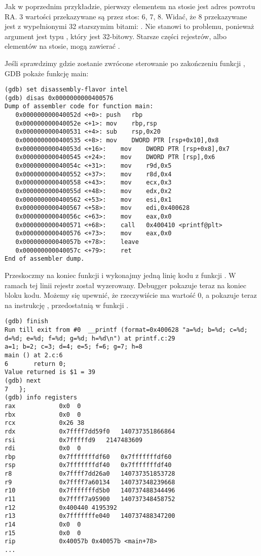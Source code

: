 Jak w poprzednim przykładzie, pierwszy elementem na stosie jest adres powrotu \ac{RA}.
3 wartości przekazywane są przez stos: 6, 7, 8.
Widać, że 8 przekazywane jest z wypełnionymi 32 starszymim bitami: .
Nie stanowi to problemu, ponieważ argument jest typu \Tint, który jest 32-bitowy.
Starsze części rejestrów, albo elementów na stosie, mogą zawierać .

Jeśli sprawdzimy gdzie zostanie zwrócone sterowanie po zakończeniu funkcji \printf, \ac{GDB} pokaże funkcję main:

\begin{lstlisting}[style=customasmx86]
(gdb) set disassembly-flavor intel
(gdb) disas 0x0000000000400576
Dump of assembler code for function main:
   0x000000000040052d <+0>:	push   rbp
   0x000000000040052e <+1>:	mov    rbp,rsp
   0x0000000000400531 <+4>:	sub    rsp,0x20
   0x0000000000400535 <+8>:	mov    DWORD PTR [rsp+0x10],0x8
   0x000000000040053d <+16>:	mov    DWORD PTR [rsp+0x8],0x7
   0x0000000000400545 <+24>:	mov    DWORD PTR [rsp],0x6
   0x000000000040054c <+31>:	mov    r9d,0x5
   0x0000000000400552 <+37>:	mov    r8d,0x4
   0x0000000000400558 <+43>:	mov    ecx,0x3
   0x000000000040055d <+48>:	mov    edx,0x2
   0x0000000000400562 <+53>:	mov    esi,0x1
   0x0000000000400567 <+58>:	mov    edi,0x400628
   0x000000000040056c <+63>:	mov    eax,0x0
   0x0000000000400571 <+68>:	call   0x400410 <printf@plt>
   0x0000000000400576 <+73>:	mov    eax,0x0
   0x000000000040057b <+78>:	leave  
   0x000000000040057c <+79>:	ret    
End of assembler dump.
\end{lstlisting}

Przeskoczmy na koniec funkcji \printf i wykonajmy jedną linię kodu z funkcji \main. W ramach tej linii rejestr \EAX został wyzerowany. Debugger pokazuje teraz na koniec bloku kodu. Możemy się upewnić, że \EAX rzeczywiście ma wartość 0, a \RIP pokazuje teraz na instrukcję , przedostatnią w funkcji \main.

\begin{lstlisting}
(gdb) finish
Run till exit from #0  __printf (format=0x400628 "a=%d; b=%d; c=%d; d=%d; e=%d; f=%d; g=%d; h=%d\n") at printf.c:29
a=1; b=2; c=3; d=4; e=5; f=6; g=7; h=8
main () at 2.c:6
6		return 0;
Value returned is $1 = 39
(gdb) next
7	};
(gdb) info registers
rax            0x0	0
rbx            0x0	0
rcx            0x26	38
rdx            0x7ffff7dd59f0	140737351866864
rsi            0x7fffffd9	2147483609
rdi            0x0	0
rbp            0x7fffffffdf60	0x7fffffffdf60
rsp            0x7fffffffdf40	0x7fffffffdf40
r8             0x7ffff7dd26a0	140737351853728
r9             0x7ffff7a60134	140737348239668
r10            0x7fffffffd5b0	140737488344496
r11            0x7ffff7a95900	140737348458752
r12            0x400440	4195392
r13            0x7fffffffe040	140737488347200
r14            0x0	0
r15            0x0	0
rip            0x40057b	0x40057b <main+78>
...
\end{lstlisting}
